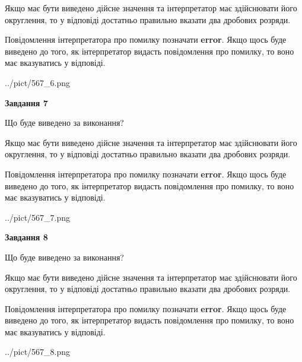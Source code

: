 \documentclass[12pt, ukrainian]{article}
\begin{document}
{\begin {Large}
Якщо має бути виведено дійсне значення та інтерпретатор має здійснювати його округлення, 
то у відповіді достатньо правильно вказати два дробових розряди.

Повідомлення інтерпретатора про помилку позначати \textbf{error}.
Якщо щось буде виведено до того, як інтерпретатор видасть повідомлення про помилку, 
то воно має вказуватись у відповіді. \par

\begin{center}
	{../pict/567_6.png}
\end{center}
\newpage

{\begin {center}\textbf{Завдання 7}\end {center}}\par
Що буде виведено за виконання? \par

Якщо має бути виведено дійсне значення та інтерпретатор має здійснювати його округлення, 
то у відповіді достатньо правильно вказати два дробових розряди.

Повідомлення інтерпретатора про помилку позначати \textbf{error}.
Якщо щось буде виведено до того, як інтерпретатор видасть повідомлення про помилку, 
то воно має вказуватись у відповіді. \par

\begin{center}
	{../pict/567_7.png}
\end{center}
\newpage

{\begin {center}\textbf{Завдання 8}\end {center}}\par
Що буде виведено за виконання? \par

Якщо має бути виведено дійсне значення та інтерпретатор має здійснювати його округлення, 
то у відповіді достатньо правильно вказати два дробових розряди.

Повідомлення інтерпретатора про помилку позначати \textbf{error}.
Якщо щось буде виведено до того, як інтерпретатор видасть повідомлення про помилку, 
то воно має вказуватись у відповіді. \par

\begin{center}
	{../pict/567_8.png}
\end{center}
\newpage


\end{Large}}
\end{document}
